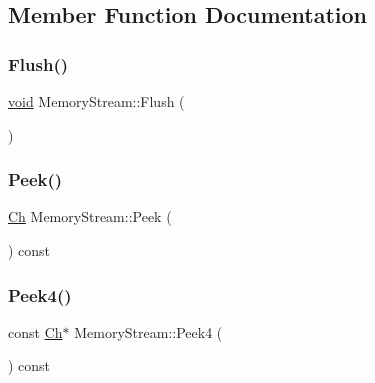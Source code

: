\subsection{Member Function Documentation}
\mbox{\label{structMemoryStream_a305e141314ae0e3afacb04aaf2d8bcc6}} 
\subsubsection{\texorpdfstring{Flush()}{Flush()}}
{\footnotesize\ttfamily \hyperlink{imgui__impl__opengl3__loader_8h_ac668e7cffd9e2e9cfee428b9b2f34fa7}{void} Memory\+Stream\+::\+Flush (\begin{DoxyParamCaption}{ }\end{DoxyParamCaption})\hspace{0.3cm}{\ttfamily [inline]}}

\mbox{\label{structMemoryStream_a707014bbfd303838b6a7b90be24f6adc}} 
\subsubsection{\texorpdfstring{Peek()}{Peek()}}
{\footnotesize\ttfamily \hyperlink{structMemoryStream_a62a1cbd052c325c83dbdb387d2f89088}{Ch} Memory\+Stream\+::\+Peek (\begin{DoxyParamCaption}{ }\end{DoxyParamCaption}) const\hspace{0.3cm}{\ttfamily [inline]}}

\mbox{\label{structMemoryStream_ac63422050829d9724086363247059089}} 
\subsubsection{\texorpdfstring{Peek4()}{Peek4()}}
{\footnotesize\ttfamily const \hyperlink{structMemoryStream_a62a1cbd052c325c83dbdb387d2f89088}{Ch}$\ast$ Memory\+Stream\+::\+Peek4 (\begin{DoxyParamCaption}{ }\end{DoxyParamCaption}) const\hspace{0.3cm}{\ttfamily [inline]}}

